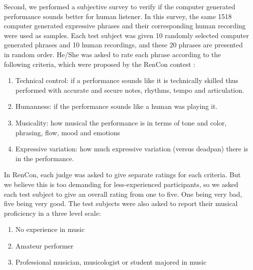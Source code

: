 Second, we performed a subjective survey to verify if the computer generated performance sounds better for human listener.  In this survey, the same 1518 computer generated expressive phrases and their corresponding human recording were used as samples. Each test subject was given 10 randomly selected computer generated phrases and 10 human recordings, and these 20 phrases are presented in random order. He/She was asked to rate each phrase according to the following criteria, which were proposed by the RenCon contest \cite{RenCon}:
\begin{enumerate}
   \item Technical control: if a performance sounds like it is technically skilled thus performed with accurate and secure notes, rhythms, tempo and articulation.
   \item  Humanness: if the performance sounds like a human was playing it.
   \item  Musicality: how musical the performance is in terms of tone and color, phrasing, flow, mood and emotions
   \item Expressive variation: how much expressive variation (versus deadpan) there is in the performance.
\end{enumerate}

In RenCon, each judge was asked to give separate ratings for each criteria. But we believe this is too demanding for less-experienced participants, so we asked each test subject to give an overall rating from one to five. One being very bad, five being very good. The test subjects were also asked to report their musical proficiency in a three level scale:
\begin{enumerate}
   \item No experience in music 
   \item Amateur performer
   \item Professional musician, musicologist or student majored in music
\end{enumerate}


